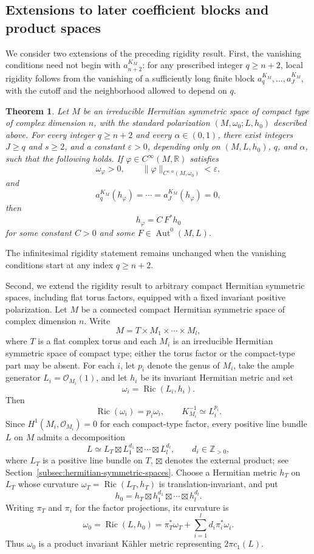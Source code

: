 \documentclass[11pt,reqno]{amsart}
\newtheorem{theorem}{Theorem}[section]
\theoremstyle{corollary}
\theoremstyle{conjecture}
\theoremstyle{assumption}
\theoremstyle{proposition}
\theoremstyle{remark}
\numberwithin{equation}{section}
\DeclareMathOperator{\Ric}{Ric}
\begin{document}
\subsection{Extensions to later coefficient blocks and product spaces}

We consider two extensions of the preceding rigidity result. First, the vanishing conditions need not begin with $a^{K_M}_{n+2}$: for any prescribed integer $q\geq n+2$, local rigidity follows from the vanishing of a sufficiently long finite block $a^{K_M}_q,\ldots,a^{K_M}_J$, with the cutoff and the neighborhood allowed to depend on $q$.

\begin{theorem}
\label{thm:finite-block-rigidity}
Let $M$ be an irreducible Hermitian symmetric space of compact type of complex dimension $n$, with the standard polarization $(M,\omega_0;L,h_0)$ described above. For every integer $q\geq n+2$ and every $\alpha\in(0,1)$,
there exist integers $J\geq q$ and $s\geq 2$, and a constant $\varepsilon>0$, depending only on $(M,L,h_0)$, $q$, and $\alpha$, such that the following holds. If $\varphi\in C^\infty(M,\mathbb R)$ satisfies
\[
\omega_\varphi>0,\qquad\|\varphi\|_{C^{s,\alpha}(M,\omega_0)}<\varepsilon,
\]
and
\[
a^{K_M}_{q}(h_{\varphi})=\cdots=a^{K_M}_{J}(h_{\varphi})=0,
\]
then
\[
h_\varphi=C\,F^*h_0
\]
for some constant $C>0$ and some $F\in\operatorname{Aut}^0(M,L)$. 
\end{theorem}

The infinitesimal rigidity statement remains unchanged when the vanishing conditions start at any index $q\geq n+2$.

Second, we extend the rigidity result to arbitrary compact Hermitian symmetric spaces, including flat torus factors, equipped with a fixed invariant positive polarization. Let $M$ be a connected compact Hermitian symmetric space of complex dimension $n$. Write
\[
M=T\times M_1\times\cdots\times M_l,
\]
where $T$ is a flat complex torus and each $M_i$ is an irreducible Hermitian symmetric space of compact type; either the torus
factor or the compact-type part may be absent. For each $i$, let $p_i$ denote the genus of $M_i$, take the ample generator $L_i=\mathcal{O}_{M_i}(1)$, and let $h_i$ be its invariant Hermitian metric and set
\[
\omega_i=\Ric(L_i,h_i).
\]
Then
\[
\Ric(\omega_i)=p_i\omega_i,\qquad K_{M_i}^{-1}\simeq L_i^{p_i}.
\]
Since $H^1(M_i,\mathcal O_{M_i})=0$ for each compact-type factor, every positive line bundle $L$ on $M$ admits a decomposition
\[
L\simeq L_T\boxtimes L_1^{d_1}\boxtimes\cdots\boxtimes L_l^{d_l},\qquad d_i\in\mathbb Z_{>0},
\]
where $L_T$ is a positive line bundle on $T$, $\boxtimes$ denotes the external product; see Section~\ref{subsec:hermitian-symmetric-spaces}. Choose a Hermitian metric $h_T$ on $L_T$ whose curvature $\omega_T=\Ric(L_T,h_T)$ is translation-invariant, and put
\[
h_0=h_T\boxtimes h_1^{d_1}\boxtimes\cdots\boxtimes h_l^{d_l}.
\]
Writing $\pi_T$ and $\pi_i$ for the factor projections, its curvature is
\[
\omega_0=\Ric(L,h_0)=\pi_T^*\omega_T+\sum_{i=1}^ld_i\pi_i^*\omega_i.
\]
Thus $\omega_0$ is a product invariant K\"ahler metric representing $2\pi c_1(L)$.
\end{document}
